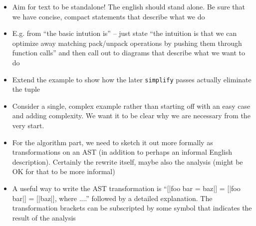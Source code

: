 \begin{itemize}
\begin{itemize}
  \item Aim for text to be standalone! The english should stand alone. Be sure
    that we have concise, compact statements that describe what we do

  \item E.g. from ``the basic intution is'' -- just state ``the intuition is
    that we can optimize away matching pack/unpack operations by pushing them
    through function calls'' and then call out to diagrams that describe what we
    want to do

  \item Extend the example to show how the later \texttt{simplify} passes
    actually eliminate the tuple

  \item Consider a single, complex example rather than starting off with an easy
    case and adding complexity. We want it to be clear why we are necessary from
    the very start.

  \item For the algorithm part, we need to sketch it out more formally as
    transformations on an AST (in addition to perhaps an informal English
    description). Certainly the rewrite itself, maybe also the analysis (might
    be OK for that to be more informal)

  \item A useful way to write the AST transformation is ``[|foo bar = baz|] =
    [|foo bar|] = [|baz|], where ....'' followed by a detailed explanation. The
    transformation brackets can be subscripted by some symbol that indicates the
    result of the analysis 

  \end{itemize}

\end{itemize}

